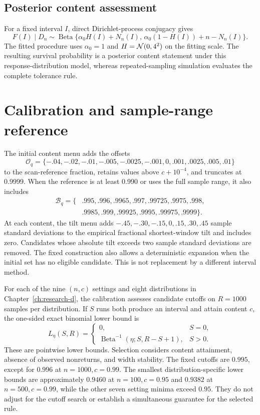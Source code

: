 \subsection{Posterior content assessment}

For a fixed interval \(I\), direct Dirichlet-process conjugacy gives
\[
F(I)\mid D_n\sim
\operatorname{Beta}\{\alpha_0H(I)+N_n(I),\,
\alpha_0(1-H(I))+n-N_n(I)\}.
\]
The fitted procedure uses \(\alpha_0=1\) and \(H=\mathcal{N}(0,4^2)\) on the fitting
scale. The resulting survival probability is a posterior content statement
under this response-distribution model, whereas repeated-sampling simulation evaluates
the complete tolerance rule.

\section{Calibration and sample-range reference}
\label{app:mti-calibration}

The initial content menu adds the offsets
\[
\mathcal O_q=\{-.04,-.02,-.01,-.005,-.0025,-.001,0,.001,.0025,.005,.01\}
\]
to the scan-reference fraction, retains values above \(c+10^{-4}\), and
truncates at 0.9999. When the reference is at least 0.990 or uses the full
sample range, it also includes
\[
\begin{split}
\mathcal B_q=\{&.995,.996,.9965,.997,.99725,.9975,.998,\\
&.9985,.999,.99925,.9995,.99975,.9999\}.
\end{split}
\]
At each content, the tilt menu adds
\(-.45,-.30,-.15,0,.15,.30,.45\) sample standard deviations to the
empirical fractional shortest-window tilt and includes zero. Candidates
whose absolute tilt exceeds two sample standard deviations are removed.
The fixed construction also allows a deterministic expansion when the
initial set has no eligible candidate. This is not replacement by a
different interval method.

For each of the nine \((n,c)\) settings and eight distributions in
Chapter~\ref{ch:research-d}, the calibration assesses candidate cutoffs on
\(R=1000\) samples per distribution. If \(S\) runs both produce an
interval and attain content \(c\), the one-sided exact binomial lower bound is
\[
L_{\eta}(S,R)=
\begin{cases}
0,&S=0,\\
\operatorname{Beta}^{-1}(\eta;S,R-S+1),&S>0.
\end{cases}
\]
These are pointwise lower bounds. Selection considers content attainment,
absence of observed nonreturns, and width stability. The fixed cutoffs are
\(0.995\), except for \(0.996\) at \(n=1000,c=0.99\).
The smallest distribution-specific lower bounds are approximately
\(0.9460\) at \(n=100,c=0.95\) and \(0.9382\) at \(n=500,c=0.99\), while
the other seven setting minima exceed \(0.95\). They do not adjust for the
cutoff search or establish a simultaneous guarantee for the selected rule.

